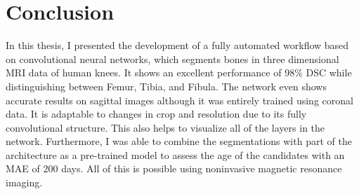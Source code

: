 \section{Conclusion}

In this thesis, I presented the development of a fully automated workflow based on convolutional neural networks, which segments bones in three dimensional MRI data of human knees. It shows an excellent performance of 98\% DSC while distinguishing between Femur, Tibia, and Fibula. The network even shows accurate results on sagittal images although it was entirely trained using coronal data. It is adaptable to changes in crop and resolution due to its fully convolutional structure. This also helps to visualize all of the layers in the network. Furthermore, I was able to combine the segmentations with part of the architecture as a pre-trained model to assess the age of the candidates with an MAE of 200 days. All of this is possible using noninvasive magnetic resonance imaging.

\newpage